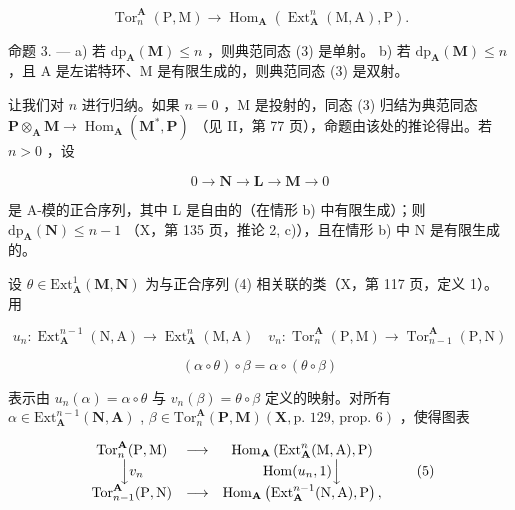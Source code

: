 \[
\operatorname{Tor} _ {n} ^ {\mathbf {A}} (\mathrm{P}, \mathrm{M}) \rightarrow \operatorname{Hom} _ {\mathbf {A}} \left(\operatorname{Ext} _ {\mathbf {A}} ^ {n} (\mathrm{M}, \mathrm{A}), \mathrm{P}\right).\tag{3}
\]

命题 3. --- a) 若 \(\mathrm{dp}_{\mathbf{A}}(\mathbf{M}) \leqslant n\) ，则典范同态 (3) 是单射。 b) 若 \(\mathrm{dp}_{\mathbf{A}}(\mathbf{M}) \leqslant n\) ，且 A 是左诺特环、M 是有限生成的，则典范同态 (3) 是双射。

让我们对 \(n\) 进行归纳。如果 \(n = 0\) ，M 是投射的，同态 (3) 归结为典范同态 \(\mathbf{P} \otimes_{\mathbf{A}} \mathbf{M} \to \operatorname{Hom}_{\mathbf{A}} (\mathbf{M}^{*}, \mathbf{P})\) （见 II，第 77 页），命题由该处的推论得出。若 \(n > 0\) ，设

\[
0 \rightarrow \mathbf {N} \rightarrow \mathbf {L} \rightarrow \mathbf {M} \rightarrow 0\tag{4}
\]

是 A-模的正合序列，其中 L 是自由的（在情形 b) 中有限生成）；则 \(\mathrm{dp}_{\mathbf{A}}(\mathbf{N}) \leqslant n - 1\) （X，第 135 页，推论 2, c)），且在情形 b) 中 N 是有限生成的。

设 \(\theta\in\mathrm{Ext}_{\mathbf{A}}^{1}(\mathbf{M},\mathbf{N})\) 为与正合序列 (4) 相关联的类（X，第 117 页，定义 1）。用

\[
u _ {n}: \operatorname{Ext} _ {\mathbf {A}} ^ {n - 1} (\mathrm{N}, \mathrm{A}) \rightarrow \operatorname{Ext} _ {\mathbf {A}} ^ {n} (\mathrm{M}, \mathrm{A}) \quad v _ {n}: \operatorname{Tor} _ {n} ^ {\mathbf {A}} (\mathrm{P}, \mathrm{M}) \rightarrow \operatorname{Tor} _ {n - 1} ^ {\mathbf {A}} (\mathrm{P}, \mathrm{N})
\]

\[
(\alpha \circ \theta) \circ \beta = \alpha \circ (\theta \circ \beta)
\]

表示由 \(u_{n}(\alpha) = \alpha \circ \theta\) 与 \(v_{n}(\beta) = \theta \circ \beta\) 定义的映射。对所有 \(\alpha\in\mathrm{Ext}_{\mathbf{A}}^{n-1}\left(\mathbf{N},\mathbf{A}\right)\) , \(\beta\in\mathrm{Tor}_{n}^{\mathbf{A}}\left(\mathbf{P},\mathbf{M}\right)\left(\mathbf{X},\text{p. 129, prop. 6}\right)\) ，使得图表

\[
\begin{array}{c c c} \operatorname{Tor} _ {n} ^ {\mathbf {A}} (\mathrm{P}, \mathrm{M}) & \longrightarrow & \operatorname{Hom} _ {\mathbf {A}} \left(\operatorname{Ext} _ {\mathbf {A}} ^ {n} (\mathrm{M}, \mathrm{A}), \mathrm{P}\right) \\ \Big \downarrow v _ {n} & & \operatorname{Hom} (u _ {n}, 1) \Big \downarrow \\ \operatorname{Tor} _ {n - 1} ^ {\mathbf {A}} (\mathrm{P}, \mathrm{N}) & \longrightarrow & \operatorname{Hom} _ {\mathbf {A}} \left(\operatorname{Ext} _ {\mathbf {A}} ^ {n - 1} (\mathrm{N}, \mathrm{A}), \mathrm{P}\right), \end{array}\tag{5}
\]

